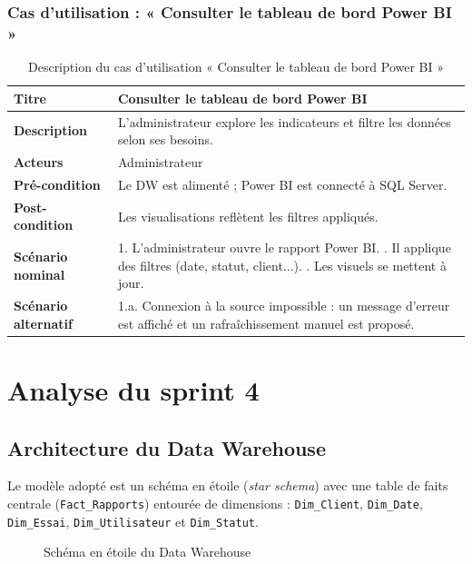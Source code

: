\subsubsection{Cas d'utilisation : « Consulter le tableau de bord Power BI »}
\begin{table}[h!]
\centering
\renewcommand{\arraystretch}{1.3}
\begin{tabularx}{\textwidth}{|l|X|}
\hline
\textbf{Titre} & Consulter le tableau de bord Power BI \\ \hline
\textbf{Description} & L'administrateur explore les indicateurs et filtre les
données selon ses besoins. \\ \hline
\textbf{Acteurs} & Administrateur \\ \hline
\textbf{Pré-condition} & Le DW est alimenté ; Power BI est connecté à SQL Server. \\ \hline
\textbf{Post-condition} & Les visualisations reflètent les filtres appliqués. \\ \hline
\textbf{Scénario nominal} &
1. L'administrateur ouvre le rapport Power BI. \newline
2. Il applique des filtres (date, statut, client...). \newline
3. Les visuels se mettent à jour. \\ \hline
\textbf{Scénario alternatif} &
1.a. Connexion à la source impossible : un message d'erreur est affiché et un
rafraîchissement manuel est proposé. \\ \hline
\end{tabularx}
\caption{Description du cas d'utilisation « Consulter le tableau de bord Power BI »}
\end{table}

\section{Analyse du sprint 4}

\subsection{Architecture du Data Warehouse}
Le modèle adopté est un schéma en étoile (\emph{star schema}) avec une table de
faits centrale (\texttt{Fact\_Rapports}) entourée de dimensions :
\texttt{Dim\_Client}, \texttt{Dim\_Date}, \texttt{Dim\_Essai},
\texttt{Dim\_Utilisateur} et \texttt{Dim\_Statut}.

\begin{figure}[h!]
\centering
{}
\caption{Schéma en étoile du Data Warehouse}
\end{figure}

